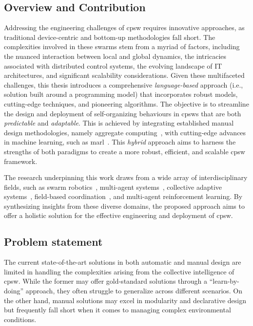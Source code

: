 \begin{refsection}
\section{Overview and Contribution}
Addressing the engineering challenges of \ac{cpsw} requires innovative approaches, 
 as traditional device-centric and bottom-up methodologies fall short. 
The complexities involved in these swarms stem from a myriad of factors, 
 including the nuanced interaction between local and global dynamics, 
 the intricacies associated with distributed control systems, 
 the evolving landscape of IT architectures, and significant scalability considerations.
%
Given these multifaceted challenges, 
 this thesis introduces a comprehensive \emph{language-based} approach (i.e., solution built around a programming model) that incorporates robust models, 
 cutting-edge techniques, and pioneering algorithms. 
 The objective is to streamline the design and deployment of self-organizing behaviours in \acp{cpsw} that are both \emph{predictable} and \emph{adaptable}. 
This is achieved by integrating established manual design methodologies, namely aggregate computing~\cite{aggregatecomputing}, 
 with cutting-edge advances in machine learning, such as \ac{marl}~\cite{busoniu2008comprehensive}. 
%
This \emph{hybrid} approach aims to harness the strengths of both paradigms to create a more robust, efficient, and scalable \ac{cpsw} framework.

The research underpinning this work draws from a wide array of interdisciplinary fields, 
 such as swarm robotics~\cite{brambilla2013swarm}, multi-agent systems~\cite{dorri2018multi}, collective adaptive systems~\cite{ferscha2015collective}, field-based coordination~\cite{mamei2006field}, and multi-agent reinforcement learning. 
By synthesizing insights from these diverse domains, 
 the proposed approach aims to offer a holistic solution for the effective engineering and deployment of \acf{cpsw}.
\subsection*{Problem statement}
The current state-of-the-art solutions in both automatic and manual design are limited in handling the complexities arising from the collective intelligence of \ac{cpsw}. 
 While the former may offer gold-standard solutions through a ``learn-by-doing'' approach, 
 they often struggle to generalize across different scenarios. 
 On the other hand, manual solutions may excel in modularity and declarative design but frequently fall short when it comes to managing complex environmental conditions.

\end{refsection}
